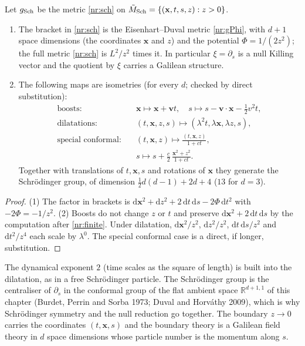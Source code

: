 \begin{nrprop}\label{nr:prop-sch}
Let $g_{\rm Sch}$ be the metric \eqref{nr:sch} on $\tilde M_{\rm Sch}=\{(\mathbf{x},t,s,z):z>0\}$.
\begin{enumerate}
\item The bracket in \eqref{nr:sch} is the Eisenhart--Duval metric
\eqref{nr:gPhi}, with $d+1$ space dimensions (the coordinates $\mathbf{x}$ and $z$)
and the potential $\Phi=1/(2z^2)$; the full metric \eqref{nr:sch} is
$L^2/z^2$ times it. In particular $\xi=\partial_s$ is a null Killing vector
and the quotient by $\xi$ carries a Galilean structure.
\item The following maps are isometries (for every $d$; checked by direct
substitution):
\begin{align*}
  \text{boosts:}\quad & \mathbf{x}\mapsto\mathbf{x}+\mathbf{v}t,\quad
     s\mapsto s-\mathbf{v}\cdot\mathbf{x}-\tfrac12v^2t,\\
  \text{dilatations:}\quad & (t,\mathbf{x},z,s)\mapsto(\lambda^2t,\lambda\mathbf{x},\lambda z,s),\\
  \text{special conformal:}\quad & (t,\mathbf{x},z)\mapsto\frac{(t,\mathbf{x},z)}{1+ct},\\
     & s\mapsto s+\frac{c}{2}\,\frac{\mathbf{x}^2+z^2}{1+ct}.
\end{align*}
Together with translations of $t,\mathbf{x},s$ and rotations of $\mathbf{x}$ they generate
the Schr\"odinger group, of dimension $\tfrac12d(d-1)+2d+4$ ($13$ for $d=3$).
\end{enumerate}
\end{nrprop}
\begin{proof}
(1) The factor in brackets is $\mathrm{d}\mathbf{x}^2+\mathrm{d}z^2+2\,\mathrm{d}t\,\mathrm{d}s-2\Phi\,\mathrm{d}t^2$
with $-2\Phi=-1/z^2$. (2) Boosts do not change $z$ or $t$ and preserve
$\mathrm{d}\mathbf{x}^2+2\,\mathrm{d}t\,\mathrm{d}s$ by the computation after
\eqref{nr:finite}. Under dilatation, $\mathrm{d}\mathbf{x}^2/z^2$, $\mathrm{d}z^2/z^2$, $\mathrm{d}t\,\mathrm{d}s/z^2$
and $\mathrm{d}t^2/z^4$ each scale by $\lambda^0$. The special conformal case is a
direct, if longer, substitution.
\end{proof}

The dynamical exponent $2$ (time scales as the square of length) is built
into the dilatation, as in a free Schr\"odinger particle. The Schr\"odinger group is
the centraliser of $\partial_s$ in the conformal group of the flat ambient
space $\mathbb{R}^{d+1,1}$ of this chapter (Burdet, Perrin and Sorba 1973; Duval and
Horv\'athy 2009), which is why Schr\"odinger symmetry and the null reduction
go together. The boundary $z\to0$ carries the coordinates $(t,\mathbf{x},s)$ and the
boundary theory is a Galilean field theory in $d$ space dimensions whose particle
number is the momentum along $s$.

